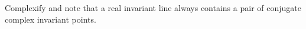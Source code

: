 Complexify and note that a real invariant line always contains a pair of conjugate complex invariant points.
